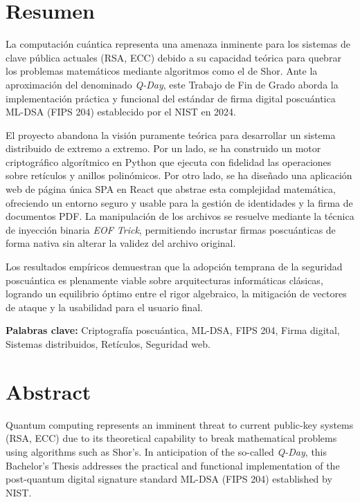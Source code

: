 \documentclass[11pt, a4paper]{report}
\theoremstyle{definition}
\begin{document}
\chapter*{Resumen}

La computación cuántica representa una amenaza inminente para los sistemas de clave pública actuales (RSA, ECC) debido a su capacidad teórica para quebrar los problemas matemáticos mediante algoritmos como el de Shor. Ante la aproximación del denominado \textit{Q-Day}, este Trabajo de Fin de Grado aborda la implementación práctica y funcional del estándar de firma digital poscuántica ML-DSA (FIPS 204) establecido por el NIST en 2024. 

El proyecto abandona la visión puramente teórica para desarrollar un sistema distribuido de extremo a extremo. Por un lado, se ha construido un motor criptográfico algorítmico en Python que ejecuta con fidelidad las operaciones sobre retículos y anillos polinómicos. Por otro lado, se ha diseñado una aplicación web de página única SPA en React que abstrae esta complejidad matemática, ofreciendo un entorno seguro y usable para la gestión de identidades y la firma de documentos PDF. La manipulación de los archivos se resuelve mediante la técnica de inyección binaria \textit{EOF Trick}, permitiendo incrustar firmas poscuánticas de forma nativa sin alterar la validez del archivo original.

Los resultados empíricos demuestran que la adopción temprana de la seguridad poscuántica es plenamente viable sobre arquitecturas informáticas clásicas, logrando un equilibrio óptimo entre el rigor algebraico, la mitigación de vectores de ataque y la usabilidad para el usuario final.

\vspace{0.5cm}
\noindent \textbf{Palabras clave:} Criptografía poscuántica, ML-DSA, FIPS 204, Firma digital, Sistemas distribuidos, Retículos, Seguridad web.

\chapter*{Abstract}

Quantum computing represents an imminent threat to current public-key systems (RSA, ECC) due to its theoretical capability to break mathematical problems using algorithms such as Shor's. In anticipation of the so-called \textit{Q-Day}, this Bachelor's Thesis addresses the practical and functional implementation of the post-quantum digital signature standard ML-DSA (FIPS 204) established by NIST.
\end{document}
